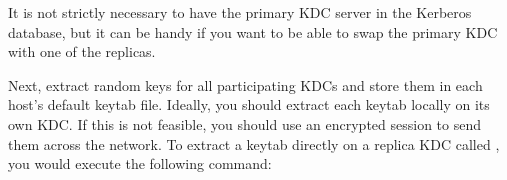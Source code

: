 \documentclass[letterpaper,10pt,english]{sphinxmanual}
\begin{document}
\begin{sphinxVerbatim}[commandchars=\\\{\}]
 
   
      
  

   
      
  
\end{sphinxVerbatim}

\sphinxAtStartPar
It is not strictly necessary to have the primary KDC server in the
Kerberos database, but it can be handy if you want to be able to swap
the primary KDC with one of the replicas.

\sphinxAtStartPar
Next, extract  random keys for all participating KDCs and
store them in each host’s default keytab file.  Ideally, you should
extract each keytab locally on its own KDC.  If this is not feasible,
you should use an encrypted session to send them across the network.
To extract a keytab directly on a replica KDC called
, you would execute the following command:
\end{document}
